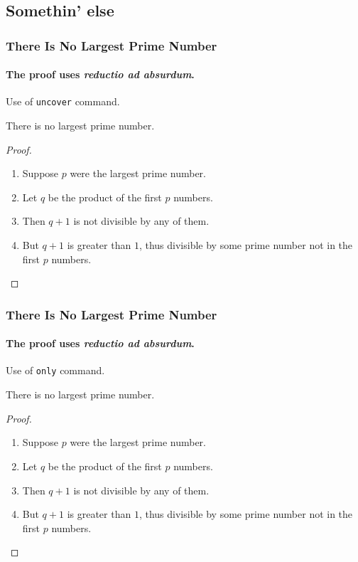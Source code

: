 \documentclass{beamer}
\begin{document}
  \subsection{Somethin' else}
  \begin{frame}
    \frametitle{There Is No Largest Prime Number}
    \framesubtitle{The proof uses \textit{reductio ad absurdum}.}
    Use of \texttt{uncover} command.
    \begin{theorem}
      There is no largest prime number.
    \end{theorem}
    \begin{proof}
      \begin{enumerate}
        \item<1-> Suppose $p$ were the largest prime number. 
        \item<2-> Let $q$ be the product of the first $p$ numbers. \item<3-> Then $q + 1$ is not divisible by any of them. 
        \item<1-> But $q + 1$ is greater than $1$, thus divisible by some prime number not in the first $p$ numbers.\qedhere 
      \end{enumerate}
    \end{proof}
  \end{frame}
  
  \begin{frame}[t] %
    \frametitle{There Is No Largest Prime Number}
    \framesubtitle{The proof uses \textit{reductio ad absurdum}.}
    Use of \texttt{only} command.
    \begin{theorem}
      There is no largest prime number.
    \end{theorem}
    \begin{proof}
      \begin{enumerate}
        \item<1-> Suppose $p$ were the largest prime number. 
        \item<2-> Let $q$ be the product of the first $p$ numbers. \item<3-> Then $q + 1$ is not divisible by any of them. 
        \item<1-> But $q + 1$ is greater than $1$, thus divisible by some prime number not in the first $p$ numbers.\qedhere 
      \end{enumerate}
    \end{proof}
  \end{frame}
  
\end{document}
